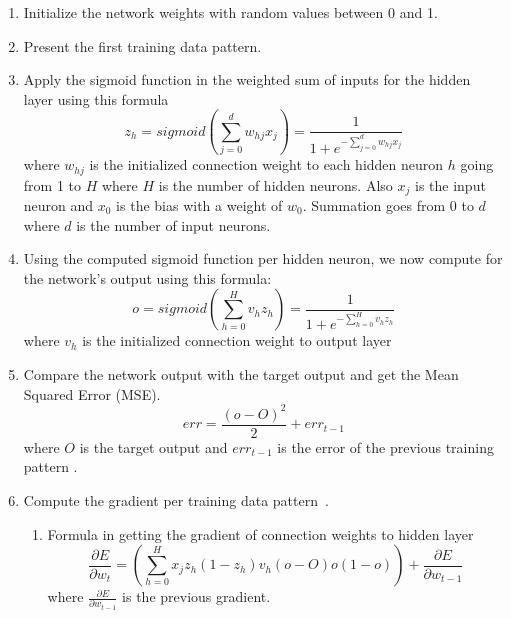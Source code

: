 \documentclass[journal]{./IEEE/IEEEtran}
\begin{document}
\begin{enumerate}
	\item \label{itm:first} Initialize the network weights with random values between 0 and 1.

	\item \label{itm:second} Present the first training data pattern.

	\item \label{itm:third} Apply the sigmoid function in the weighted sum of inputs for the hidden layer using this formula
	\begin{equation}
	z_{h} = sigmoid (\sum_{j=0}^{d}w_{hj}x_{j}) = \frac{1}{1+e^{-\sum_{j=0}^{d}w_{hj}x_{j}}}
	\end{equation}
	where $w_{hj}$ is the initialized connection weight to each hidden neuron $h$ going from 1 to $H$ where $H$ is the number of hidden neurons. Also $x_{j}$ is the input neuron and $x_{0}$ is the bias with a weight of $w_{0}$. Summation goes from 0 to $d$ where $d$ is the number of input neurons.

	\item \label{itm:fourth} Using the computed sigmoid function per hidden neuron, we now compute for the network's output using this formula:
 	\begin{equation}
	o = sigmoid (\sum_{h=0}^{H}v_{h}z_{h}) = \frac {1}{1+e^{-\sum_{h=0}^{H}v_{h}z_{h}}}
	\end{equation}
	where $v_{h}$ is the initialized connection weight to output layer

	\item \label{itm:fifth} Compare the network output with the target output and get the Mean Squared Error (MSE).
	\begin{equation}
	err = \frac {(o-O)^2}{2} + err_{t-1}
	\end{equation}
	where $O$ is the target output and $err_{t-1}$ is the error of the previous training pattern .

	\item \label{itm:sixth} Compute the gradient per training data pattern~\cite{Heaton11a}.
	\begin{enumerate}
		\item Formula in getting the gradient of connection weights to hidden layer
		\begin{equation}
		\frac{\partial E}{\partial w_{t}}=(\sum_{h=0}^{H}  x_{j} z_{h} (1-z_{h}) v_{h} (o-O) o (1-o))+\frac{\partial E}{\partial w_{t-1}}
		\end{equation}
		where $ \frac{\partial E}{\partial w_{t-1}}$ is the previous gradient.


\end{enumerate}
\end{enumerate}
\end{document}
